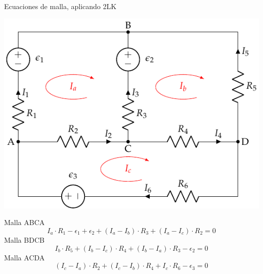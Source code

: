 \documentclass[aspectratio=169, xcolor={usenames,svgnames,dvipsnames}]{beamer}
\begin{document}
\begin{frame}{Ecuaciones de malla, aplicando 2LK}
    \begin{center}
    \includegraphics[height=0.45\textheight]{../figs/mallas1_corrientes.pdf}
    \end{center}
    
    Malla ABCA
    \begin{equation*}
      I_a \cdot R_1 - \epsilon_1 + \epsilon_2 + (I_a - I_b) \cdot R_3 + (I_a - I_c) \cdot R_2 = 0
    \end{equation*}
    Malla BDCB
    \begin{equation*}
      I_b \cdot R_5 + (I_b - I_c) \cdot R_4 + (I_b - I_a) \cdot R_3 - \epsilon_2 = 0
    \end{equation*}
    Malla ACDA
    \begin{equation*}
      (I_c - I_a) \cdot R_2 + (I_c - I_b) \cdot R_4 + I_c \cdot R_6 - \epsilon_3 = 0
    \end{equation*}
\end{frame}

\end{document}
